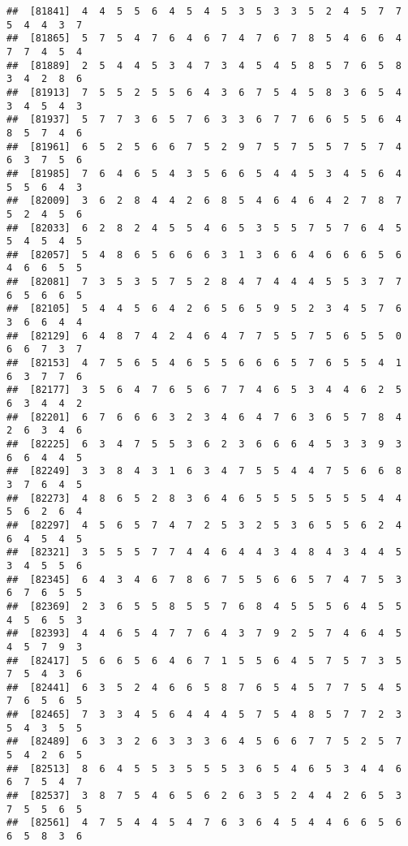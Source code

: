 \documentclass[
]{book}
\begin{document}
\begin{verbatim}
##  [81841]  4  4  5  5  6  4  5  4  5  3  5  3  3  5  2  4  5  7  7  5  4  4  3  7
##  [81865]  5  7  5  4  7  6  4  6  7  4  7  6  7  8  5  4  6  6  4  7  7  4  5  4
##  [81889]  2  5  4  4  5  3  4  7  3  4  5  4  5  8  5  7  6  5  8  3  4  2  8  6
##  [81913]  7  5  5  2  5  5  6  4  3  6  7  5  4  5  8  3  6  5  4  3  4  5  4  3
##  [81937]  5  7  7  3  6  5  7  6  3  3  6  7  7  6  6  5  5  6  4  8  5  7  4  6
##  [81961]  6  5  2  5  6  6  7  5  2  9  7  5  7  5  5  7  5  7  4  6  3  7  5  6
##  [81985]  7  6  4  6  5  4  3  5  6  6  5  4  4  5  3  4  5  6  4  5  5  6  4  3
##  [82009]  3  6  2  8  4  4  2  6  8  5  4  6  4  6  4  2  7  8  7  5  2  4  5  6
##  [82033]  6  2  8  2  4  5  5  4  6  5  3  5  5  7  5  7  6  4  5  5  4  5  4  5
##  [82057]  5  4  8  6  5  6  6  6  3  1  3  6  6  4  6  6  6  5  6  4  6  6  5  5
##  [82081]  7  3  5  3  5  7  5  2  8  4  7  4  4  4  5  5  3  7  7  6  5  6  6  5
##  [82105]  5  4  4  5  6  4  2  6  5  6  5  9  5  2  3  4  5  7  6  3  6  6  4  4
##  [82129]  6  4  8  7  4  2  4  6  4  7  7  5  5  7  5  6  5  5  0  6  6  7  3  7
##  [82153]  4  7  5  6  5  4  6  5  5  6  6  6  5  7  6  5  5  4  1  6  3  7  7  6
##  [82177]  3  5  6  4  7  6  5  6  7  7  4  6  5  3  4  4  6  2  5  6  3  4  4  2
##  [82201]  6  7  6  6  6  3  2  3  4  6  4  7  6  3  6  5  7  8  4  2  6  3  4  6
##  [82225]  6  3  4  7  5  5  3  6  2  3  6  6  6  4  5  3  3  9  3  6  6  4  4  5
##  [82249]  3  3  8  4  3  1  6  3  4  7  5  5  4  4  7  5  6  6  8  3  7  6  4  5
##  [82273]  4  8  6  5  2  8  3  6  4  6  5  5  5  5  5  5  5  4  4  5  6  2  6  4
##  [82297]  4  5  6  5  7  4  7  2  5  3  2  5  3  6  5  5  6  2  4  6  4  5  4  5
##  [82321]  3  5  5  5  7  7  4  4  6  4  4  3  4  8  4  3  4  4  5  3  4  5  5  6
##  [82345]  6  4  3  4  6  7  8  6  7  5  5  6  6  5  7  4  7  5  3  6  7  6  5  5
##  [82369]  2  3  6  5  5  8  5  5  7  6  8  4  5  5  5  6  4  5  5  4  5  6  5  3
##  [82393]  4  4  6  5  4  7  7  6  4  3  7  9  2  5  7  4  6  4  5  4  5  7  9  3
##  [82417]  5  6  6  5  6  4  6  7  1  5  5  6  4  5  7  5  7  3  5  7  5  4  3  6
##  [82441]  6  3  5  2  4  6  6  5  8  7  6  5  4  5  7  7  5  4  5  7  6  5  6  5
##  [82465]  7  3  3  4  5  6  4  4  4  5  7  5  4  8  5  7  7  2  3  5  4  3  5  5
##  [82489]  6  3  3  2  6  3  3  3  6  4  5  6  6  7  7  5  2  5  7  5  4  2  6  5
##  [82513]  8  6  4  5  5  3  5  5  5  3  6  5  4  6  5  3  4  4  6  6  7  5  4  7
##  [82537]  3  8  7  5  4  6  5  6  2  6  3  5  2  4  4  2  6  5  3  7  5  5  6  5
##  [82561]  4  7  5  4  4  5  4  7  6  3  6  4  5  4  4  6  6  5  6  6  5  8  3  6

\end{verbatim}
\end{document}
